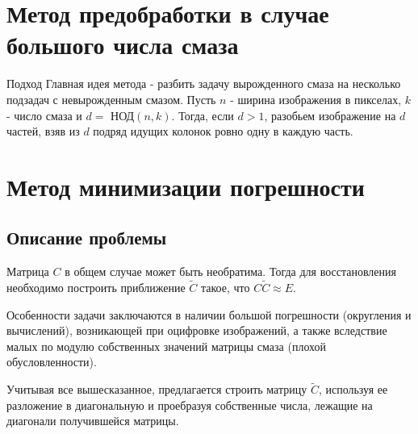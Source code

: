 \documentclass[10pt]{beamer}
\begin{document}
\section[Метод разбиения]{Метод предобработки в случае большого числа смаза}
\begin{frame}
\begin{block}{Подход}
Главная идея метода - разбить задачу вырожденного смаза на несколько подзадач с невырожденным смазом.
Пусть $n$ - ширина изображения в пикселах, $k$ - число смаза и $d =$ НОД$(n, k)$. Тогда, если $d > 1$, разобьем изображение на $d$ частей, взяв из $d$ подряд идущих колонок ровно одну в каждую часть.

\end{block}

\end{frame}


\section[Метод минимизации]{Метод минимизации погрешности}
\begin{frame}
\subsection{Описание проблемы}
\begin{block}{}
Матрица $C$ в общем случае может быть необратима. Тогда для восстановления необходимо построить приближение $\tilde{C}$ такое, что $C\tilde{C} \approx E$.
\end{block}

\begin{block}{}
Особенности задачи заключаются в наличии большой погрешности (округления и вычислений), возникающей при оцифровке изображений, а также вследствие малых по модулю собственных значений матрицы смаза (плохой обусловленности).
\end{block}

\begin{block}{}
Учитывая все вышесказанное, предлагается строить матрицу $\tilde{C}$, используя ее разложение в диагональную и проебразуя собственные числа, лежащие на диагонали получившейся матрицы.
\end{block}

\end{frame}
\end{document}
